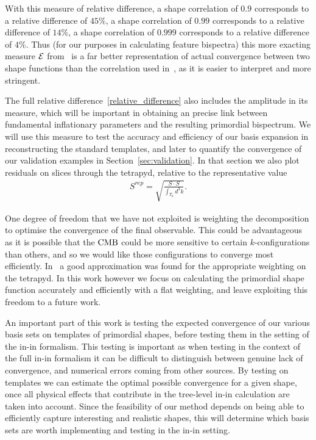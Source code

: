 With this measure of relative difference, a shape correlation of $0.9$ corresponds to a
relative difference of $45\%$,
a shape correlation of $0.99$ corresponds to a relative difference of $14\%$,
a shape correlation of $0.999$ corresponds to a relative difference of $4\%$.
Thus (for our purposes in calculating feature bispectra)
this more exacting measure $\mathcal{E}$ from~\cite{hung_1902} is a far better representation of actual convergence
between two shape functions
than the correlation used in~\cite{Funakoshi}, as it is easier to interpret and
more stringent.


The full relative difference~\eqref{relative_difference} also includes the amplitude
in its measure, which will be important in obtaining an precise link
between fundamental inflationary parameters and the resulting primordial bispectrum.
We will use this measure to test the accuracy and efficiency of our basis expansion
in reconstructing the standard templates, and later to quantify the convergence
of our validation examples in Section~\ref{sec:validation}.
In that section we also plot residuals on slices through the tetrapyd,
relative to the representative value
\begin{align}\label{rep_val}
    S^{rep}=\sqrt{\frac{S\cdot S}{\int_{T_k} d^3k}}.
\end{align}


    One degree of freedom that we have not exploited is weighting the decomposition
    to optimise the convergence of the final observable.
    This could be advantageous as it is possible that the $\text{CMB}$ could be more sensitive
    to certain $k$-configurations than others, and so we would like those configurations to
    converge most efficiently.
    In~\cite{FergShell_2} a good approximation was found for the appropriate weighting
    on the tetrapyd.
    In this work however we focus on calculating the primordial shape function accurately
    and efficiently with a flat weighting, and leave exploiting this freedom to a future work.


    An important part of this work is testing the expected convergence of our various
    basis sets on templates of primordial shapes, before testing them in the setting
    of the in-in formalism.
    This testing is important as when testing in the context of the full in-in formalism
    it can be difficult to distinguish between genuine lack of convergence, and
    numerical errors coming from other sources.
    By testing on templates we can estimate the optimal possible
    convergence for a given shape, once all physical effects that contribute
    in the tree-level in-in calculation are taken into account.
    Since the feasibility of our method depends on being able
    to efficiently capture interesting and realistic shapes, this will determine
    which basis sets are worth implementing and testing in the in-in setting.


